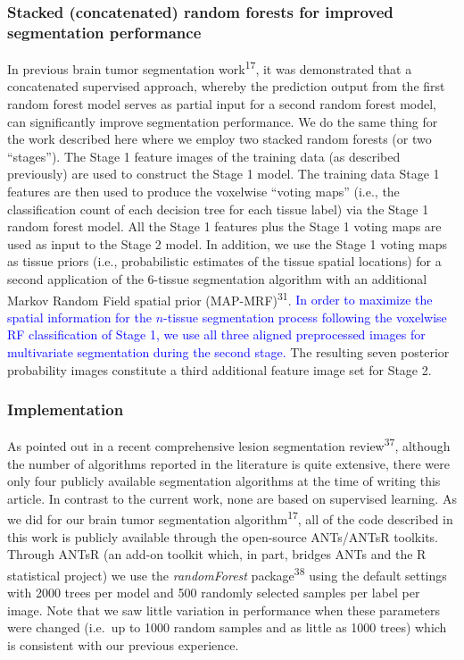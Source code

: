 \documentclass[11pt,]{article}
\begin{document}
\subsubsection{Stacked (concatenated) random forests for improved
segmentation
performance}\label{stacked-concatenated-random-forests-for-improved-segmentation-performance}

In previous brain tumor segmentation work\textsuperscript{17}, it was
demonstrated that a concatenated supervised approach, whereby the
prediction output from the first random forest model serves as partial
input for a second random forest model, can significantly improve
segmentation performance. We do the same thing for the work described
here where we employ two stacked random forests (or two ``stages''). The
Stage 1 feature images of the training data (as described previously)
are used to construct the Stage 1 model. The training data Stage 1
features are then used to produce the voxelwise ``voting maps'' (i.e.,
the classification count of each decision tree for each tissue label)
via the Stage 1 random forest model. All the Stage 1 features plus the
Stage 1 voting maps are used as input to the Stage 2 model. In addition,
we use the Stage 1 voting maps as tissue priors (i.e., probabilistic
estimates of the tissue spatial locations) for a second application of
the \(6\)-tissue segmentation algorithm with an additional Markov Random
Field spatial prior (MAP-MRF)\textsuperscript{31}.
\textcolor{blue}{In order to maximize the spatial information for the $n$-tissue segmentation process following the voxelwise RF classification of Stage 1, we use
all three aligned preprocessed images for multivariate segmentation during the
second stage.} The resulting seven posterior probability images
constitute a third additional feature image set for Stage 2.

\subsubsection{Implementation}\label{implementation}

As pointed out in a recent comprehensive lesion segmentation
review\textsuperscript{37}, although the number of algorithms reported
in the literature is quite extensive, there were only four publicly
available segmentation algorithms at the time of writing this article.
In contrast to the current work, none are based on supervised learning.
As we did for our brain tumor segmentation
algorithm\textsuperscript{17}, all of the code described in this work is
publicly available through the open-source ANTs/ANTsR toolkits. Through
ANTsR (an add-on toolkit which, in part, bridges ANTs and the R
statistical project) we use the \emph{randomForest}
package\textsuperscript{38} using the default settings with 2000 trees
per model and 500 randomly selected samples per label per image. Note
that we saw little variation in performance when these parameters were
changed (i.e.~up to 1000 random samples and as little as 1000 trees)
which is consistent with our previous experience.
\end{document}
